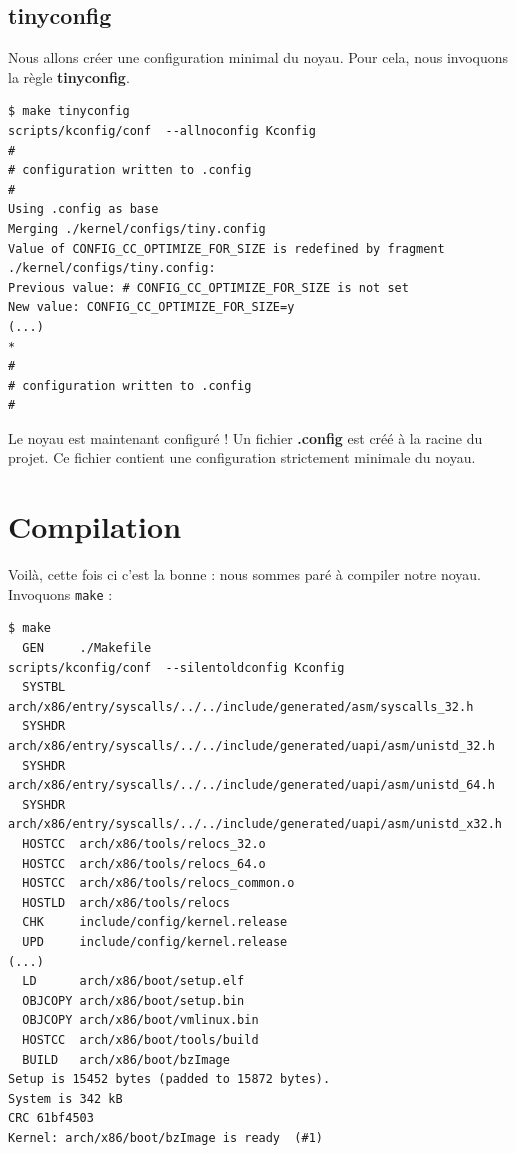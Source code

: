 \documentclass[a4paper]{article}
\begin{document}
\subsection{tinyconfig}

Nous allons créer une configuration minimal du noyau. Pour cela, nous invoquons la règle \textbf{tinyconfig}.

\begin{verbatim}
$ make tinyconfig
scripts/kconfig/conf  --allnoconfig Kconfig
#
# configuration written to .config
#
Using .config as base
Merging ./kernel/configs/tiny.config
Value of CONFIG_CC_OPTIMIZE_FOR_SIZE is redefined by fragment ./kernel/configs/tiny.config:
Previous value: # CONFIG_CC_OPTIMIZE_FOR_SIZE is not set
New value: CONFIG_CC_OPTIMIZE_FOR_SIZE=y
(...)
*
#
# configuration written to .config
#
\end{verbatim}

Le noyau est maintenant configuré ! Un fichier \textbf{.config} est créé à la racine du projet. Ce fichier contient une configuration strictement minimale du noyau.

\section{Compilation}

Voilà, cette fois ci c'est la bonne : nous sommes paré à compiler notre noyau. Invoquons \lstset{language=sh}\lstinline{make} :\\

\begin{verbatim}
$ make
  GEN     ./Makefile
scripts/kconfig/conf  --silentoldconfig Kconfig
  SYSTBL  arch/x86/entry/syscalls/../../include/generated/asm/syscalls_32.h
  SYSHDR  arch/x86/entry/syscalls/../../include/generated/uapi/asm/unistd_32.h
  SYSHDR  arch/x86/entry/syscalls/../../include/generated/uapi/asm/unistd_64.h
  SYSHDR  arch/x86/entry/syscalls/../../include/generated/uapi/asm/unistd_x32.h
  HOSTCC  arch/x86/tools/relocs_32.o
  HOSTCC  arch/x86/tools/relocs_64.o
  HOSTCC  arch/x86/tools/relocs_common.o
  HOSTLD  arch/x86/tools/relocs
  CHK     include/config/kernel.release
  UPD     include/config/kernel.release
(...)
  LD      arch/x86/boot/setup.elf
  OBJCOPY arch/x86/boot/setup.bin
  OBJCOPY arch/x86/boot/vmlinux.bin
  HOSTCC  arch/x86/boot/tools/build
  BUILD   arch/x86/boot/bzImage
Setup is 15452 bytes (padded to 15872 bytes).
System is 342 kB
CRC 61bf4503
Kernel: arch/x86/boot/bzImage is ready  (#1)
\end{verbatim}
\end{document}
